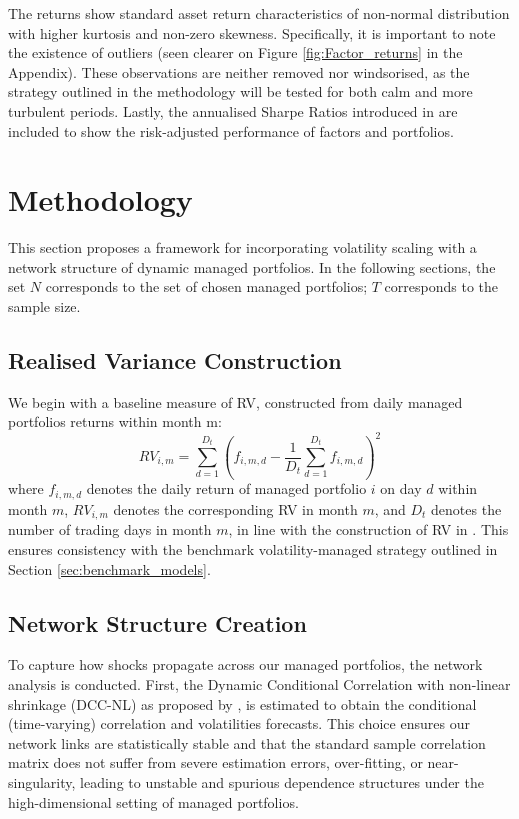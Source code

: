 \documentclass[11pt]{article}
\begin{document}
The returns show standard asset return characteristics of non-normal distribution with higher kurtosis and non-zero skewness. Specifically, it is important to note the existence of outliers (seen clearer on Figure \ref{fig:Factor_returns} in the Appendix). These observations are neither removed nor windsorised, as the strategy outlined in the methodology will be tested for both calm and more turbulent periods. Lastly, the annualised Sharpe Ratios introduced in \cite{Sharpe1966} are included to show the risk-adjusted performance of factors and portfolios. 


\section{Methodology}
\label{sec:methodology}
This section proposes a framework for incorporating volatility scaling with a network structure of dynamic managed portfolios. In the following sections, the set $N$ corresponds to the set of chosen managed portfolios; $T$ corresponds to the sample size.

\subsection{Realised Variance Construction}
We begin with a baseline measure of RV, constructed from daily managed portfolios returns within month m:
\begin{equation}
\label{eq:realized_variance_moreria}
RV_{i,m} =
\sum_{d=1}^{D_t}
\left(
f_{i,m,d}
-
\frac{1}{D_t}\sum_{d=1}^{D_t} f_{i,m,d}
\right)^2
\end{equation}
where $f_{i,m,d}$ denotes the daily return of managed portfolio $i$ on day $d$ within month $m$, $RV_{i,m}$ denotes the corresponding RV in month $m$, and $D_t$ denotes the number of trading days in month $m$, in line with the construction of RV in \cite{moreira2017volatility}. This ensures consistency with the benchmark volatility-managed strategy outlined in Section \ref{sec:benchmark_models}. 

\subsection{Network Structure Creation}
To capture how shocks propagate across our managed portfolios, the network analysis is conducted. First, the Dynamic Conditional Correlation with non-linear shrinkage (DCC-NL) as proposed by \cite{engle2019large}, is estimated to obtain the conditional (time-varying) correlation and volatilities forecasts. This choice ensures our network links are statistically stable and that the standard sample correlation matrix does not suffer from severe estimation errors, over-fitting, or near-singularity, leading to unstable and spurious dependence structures under the high-dimensional setting of managed portfolios. 
\end{document}
